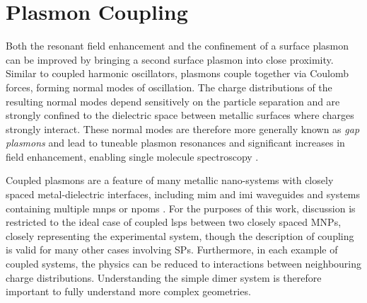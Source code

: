 \documentclass{article}
\begin{document}
\section{Plasmon Coupling}

Both the resonant field enhancement and the confinement of a surface plasmon can be improved by bringing a second surface plasmon into close proximity. Similar to coupled harmonic oscillators, plasmons couple together via Coulomb forces, forming normal modes of oscillation. The charge distributions of the resulting normal modes depend sensitively on the particle separation and are strongly confined to the dielectric space between metallic surfaces where charges strongly interact. These normal modes are therefore more generally known as \emph{gap plasmons} and lead to tuneable plasmon resonances \cite{huang2010, millyard2012} and significant increases in field enhancement, enabling single molecule spectroscopy \cite{mertens2013, taylor2014}.

Coupled plasmons are a feature of many metallic nano-systems with closely spaced metal-dielectric interfaces, including \gls{mim} and \gls{imi} waveguides \cite{maier2007plasmonics, lindquist2013} and systems containing multiple \glspl{mnp} \cite{maier2002, atay2004, muskens2007, huang2010, millyard2012, taylor2011, herrmann2013} or \glspl{npom} \cite{okamoto2003, daniels2005, kinnan2007, mubeen2012, mertens2013, denijs2014}. For the purposes of this work, discussion is restricted to the ideal case of coupled \glspl{lsp} between two closely spaced MNPs, closely representing the experimental system, though the description of coupling is valid for many other cases involving SPs. Furthermore, in each example of coupled systems, the physics can be reduced to interactions between neighbouring charge distributions. Understanding the simple dimer system is therefore important to fully understand more complex geometries.
\end{document}
